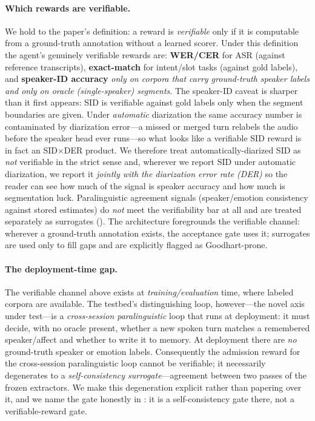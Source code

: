 \paragraph{Which rewards are verifiable.} We hold to the paper's definition: a reward is \emph{verifiable} only if it is computable from a ground-truth annotation without a learned scorer. Under this definition the agent's genuinely verifiable rewards are: \textbf{WER/CER} for ASR (against reference transcripts), \textbf{exact-match} for intent/slot tasks (against gold labels), and \textbf{speaker-ID accuracy} \emph{only on corpora that carry ground-truth speaker labels and only on oracle (single-speaker) segments}. The speaker-ID caveat is sharper than it first appears: SID is verifiable against gold labels only when the segment boundaries are given. Under \emph{automatic} diarization the same accuracy number is contaminated by diarization error---a missed or merged turn relabels the audio before the speaker head ever runs---so what looks like a verifiable SID reward is in fact an SID$\times$DER product. We therefore treat automatically-diarized SID as \emph{not} verifiable in the strict sense and, wherever we report SID under automatic diarization, we report it \emph{jointly with the diarization error rate (DER)} so the reader can see how much of the signal is speaker accuracy and how much is segmentation luck. Paralinguistic agreement signals (speaker/emotion consistency against stored estimates) do \emph{not} meet the verifiability bar at all and are treated separately as surrogates (). The architecture foregrounds the verifiable channel: wherever a ground-truth annotation exists, the acceptance gate uses it; surrogates are used only to fill gaps and are explicitly flagged as Goodhart-prone.

\paragraph{The deployment-time gap.} The verifiable channel above exists at \emph{training/evaluation} time, where labeled corpora are available. The testbed's distinguishing loop, however---the novel axis under test---is a \emph{cross-session paralinguistic} loop that runs at deployment: it must decide, with no oracle present, whether a new spoken turn matches a remembered speaker/affect and whether to write it to memory. At deployment there are \emph{no} ground-truth speaker or emotion labels. Consequently the admission reward for the cross-session paralinguistic loop cannot be verifiable; it necessarily degenerates to a \emph{self-consistency surrogate}---agreement between two passes of the frozen extractors. We make this degeneration explicit rather than papering over it, and we name the gate honestly in : it is a self-consistency gate there, not a verifiable-reward gate.

